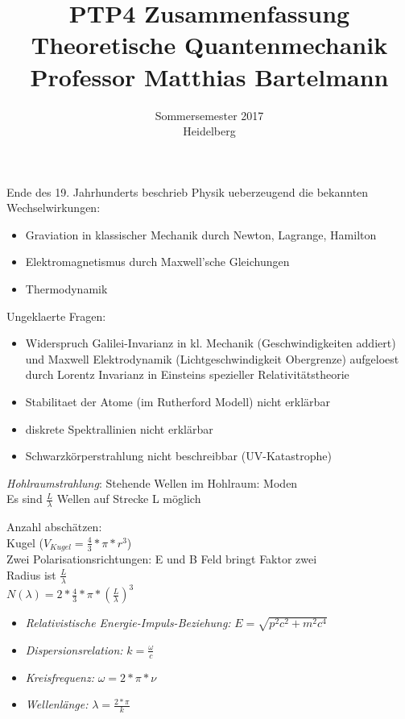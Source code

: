 \documentclass{article}
\begin{document}
\title{PTP4 Zusammenfassung \\ Theoretische Quantenmechanik \\ Professor Matthias Bartelmann}

\date{Sommersemester 2017\\Heidelberg}
\maketitle


Ende des 19. Jahrhunderts beschrieb Physik ueberzeugend die bekannten Wechselwirkungen:
\begin{itemize}
\item Graviation in klassischer Mechanik durch Newton, Lagrange, Hamilton
\item Elektromagnetismus durch Maxwell'sche Gleichungen
\item Thermodynamik
\end{itemize}

Ungeklaerte Fragen: 
\begin{itemize}
\item Widerspruch Galilei-Invarianz in kl. Mechanik (Geschwindigkeiten addiert) und Maxwell Elektrodynamik (Lichtgeschwindigkeit Obergrenze) aufgeloest durch Lorentz Invarianz in Einsteins spezieller Relativit\"atstheorie
\item Stabilitaet der Atome (im Rutherford Modell) nicht erkl\"arbar
\item diskrete Spektrallinien nicht erkl\"arbar
\item Schwarzk\"orperstrahlung nicht beschreibbar (UV-Katastrophe)
\end{itemize}

\emph{Hohlraumstrahlung}: 
Stehende Wellen im Hohlraum: Moden \\
Es sind $\frac{L}{\lambda}$ Wellen auf Strecke L m\"oglich


Anzahl absch\"atzen: \\
Kugel ($V_{Kugel}=\frac{4}{3}*\pi*r^3$)\\
Zwei Polarisationsrichtungen: E und B Feld bringt Faktor zwei\\
Radius ist $\frac{L}{\lambda}$\\
$N(\lambda)  = 2*\frac{4}{3}*\pi*(\frac{L}{\lambda})^3$\\

\begin{itemize}
\item\emph{Relativistische Energie-Impuls-Beziehung:} $E = \sqrt{p^2c^2 + m^2c^4} $
\item\emph{Dispersionsrelation:} $k = \frac{\omega}{c}$
\item\emph{Kreisfrequenz:} $\omega = 2*\pi*\nu$
\item\emph{Wellenl\"ange:} $\lambda = \frac{2*\pi}{k}$
\end{itemize}
\end{document}
